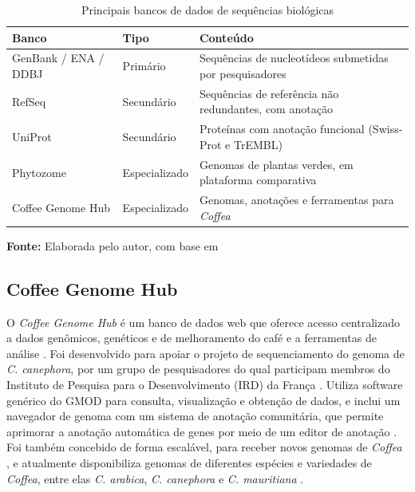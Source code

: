 \FloatBarrier
\begin{table}[!htbp]
	\centering
	\SingleSpacing\small
	\caption{Principais bancos de dados de sequências biológicas}
	\begin{tabularx}{\textwidth}{@{}llX@{}}
		\toprule
		\textbf{Banco} & \textbf{Tipo} & \textbf{Conteúdo} \\
		\midrule
		GenBank / ENA / DDBJ & Primário      & Sequências de nucleotídeos submetidas por pesquisadores \\
		RefSeq               & Secundário    & Sequências de referência não redundantes, com anotação \\
		UniProt              & Secundário    & Proteínas com anotação funcional (Swiss-Prot e TrEMBL) \\
		Phytozome            & Especializado & Genomas de plantas verdes, em plataforma comparativa \\
		Coffee Genome Hub    & Especializado & Genomas, anotações e ferramentas para \textit{Coffea} \\
		\bottomrule
	\end{tabularx}
	\par\vspace{0.2cm}
	\textbf{Fonte:} Elaborada pelo autor, com base em 
	\label{tab:bancos}
\end{table}
\FloatBarrier

\subsection{Coffee Genome Hub}

O \textit{Coffee Genome Hub} é um banco de dados web que oferece acesso centralizado a dados genômicos, genéticos e de melhoramento do café e a ferramentas de análise \cite{CoffeeHub}. Foi desenvolvido para apoiar o projeto de sequenciamento do genoma de \textit{C. canephora}, por um grupo de pesquisadores do qual participam membros do Instituto de Pesquisa para o Desenvolvimento (IRD) da França \cite{Dereeper2015, CoffeeHub}. Utiliza software genérico do GMOD para consulta, visualização e obtenção de dados, e inclui um navegador de genoma com um sistema de anotação comunitária, que permite aprimorar a anotação automática de genes por meio de um editor de anotação \cite{Dereeper2015}. Foi também concebido de forma escalável, para receber novos genomas de \textit{Coffea} \cite{Dereeper2015}, e atualmente disponibiliza genomas de diferentes espécies e variedades de \textit{Coffea}, entre elas \textit{C. arabica}, \textit{C. canephora} e \textit{C. mauritiana} \cite{CoffeeHub}.

